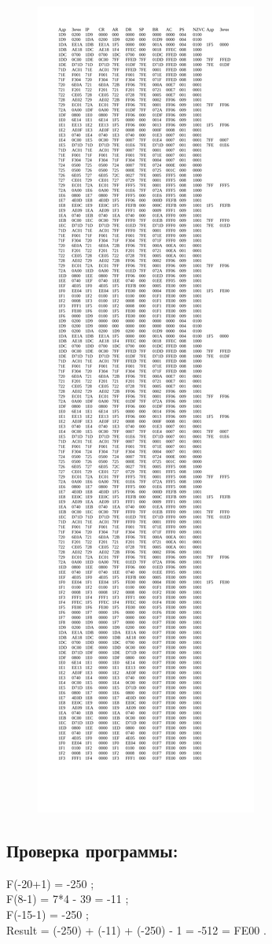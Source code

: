 \begin{figure}[H]
    \centering
    \includegraphics[scale=0.32]{img/trss}
\end{figure}

\subsection{Проверка программы:}
\noindent
F(-20+1) = -250 ; \\
F(8-1) = 7*4 - 39 = -11 ; \\
F(-15-1) = -250 ; \\
Result = (-250) + (-11) + (-250) - 1 = -512 = FE00 . \\


